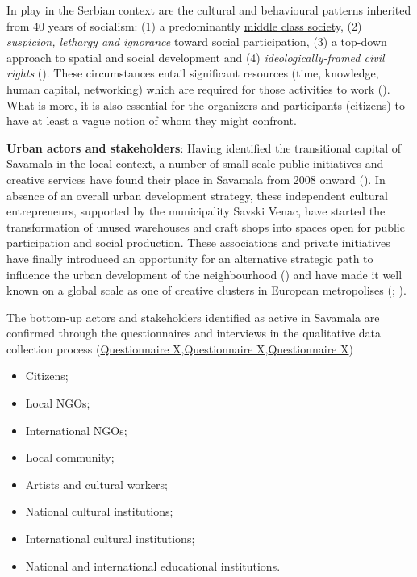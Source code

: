 \documentclass[11pt]{report}
\begin{document}
{{{{\begin{itemize}
In play in the Serbian context are the cultural and behavioural patterns inherited from 40 years of socialism: (1) a predominantly  \underline{middle class society},
(2) \textit{suspicion, lethargy and ignorance} toward social participation,
(3) a top-down approach to spatial and social development and
(4) \textit{ideologically-framed civil rights} (\href{Bolay}{\citealt{bolay_instrumental_2014}}).
These circumstances entail significant resources (time, knowledge, human capital, networking) which are required  for those activities to work (\href{ref}{\citealt{ministarstvo_prostora_urbani_2014}}).
What is more, it is also essential for the organizers and participants (citizens) to have at least a vague notion of whom they might confront.

\textbf{Urban actors and stakeholders}:
Having identified the transitional capital of Savamala in the local context, a number of small-scale public initiatives and creative services have found their place in Savamala from 2008 onward (\href{Cvetinovic}{\citealt{cvetinovic_engine_2013}}).
In absence of an overall urban development strategy, these independent cultural entrepreneurs, supported by the municipality Savski Venac, have started the  transformation  of unused warehouses and craft shops into spaces open for public participation and social production. These associations and private initiatives have finally introduced an opportunity for an alternative strategic path to influence the urban development of the neighbourhood (\href{Mikser}{\citealt{mikser_festival_mikser_2012}}) and have made it well known on a global scale as one of creative clusters in European metropolises  (\href{Monocle}{\citealt{monocle_are_2016}}; \href{MikserHouse}{\citealt{mikser_house_guardian:_2016}}).

The bottom-up actors and stakeholders identified as active in Savamala are confirmed through the questionnaires and interviews in the qualitative data collection process (\href{Questionnaire Experts Post-socialist}{Questionnaire X},\href{Questionnaire Experts Savamala}{Questionnaire X},\href{Questionnaire Students Savamala}{Questionnaire X})

\begin{itemize}
\item Citizens;
\item Local NGOs;
\item International NGOs;
\item Local community;
\item Artists and cultural workers;
\item National cultural institutions;
\item International cultural institutions;
\item National and international educational institutions.
\end{itemize}


\end{itemize}}}}}
\end{document}

